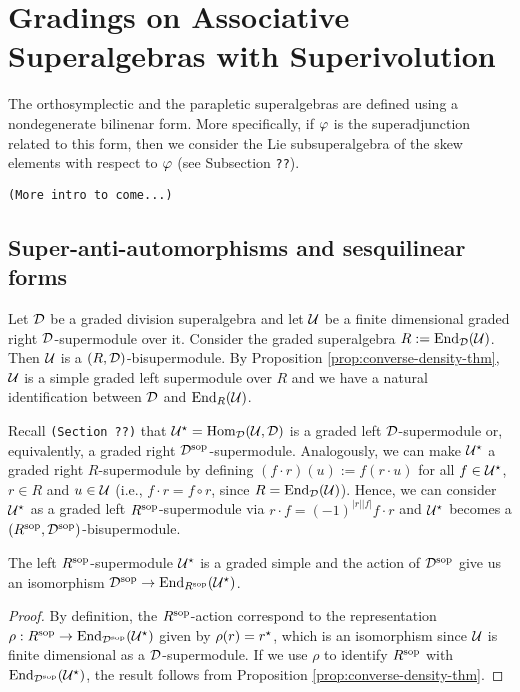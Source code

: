 \documentclass{amsbook}
\begin{document}
\chapter{Gradings on Associative Superalgebras with Superivolution}

The orthosymplectic and the parapletic superalgebras are defined using a nondegenerate bilinenar form. 
More specifically, if $\varphi$ is the superadjunction related to this form, then we consider the Lie subsuperalgebra of the skew elements with respect to $\varphi$ (see Subsection {\tt ??}). 

\vspace{5mm}
{\tt (More intro to come...)}



\section{Super-anti-automorphisms and sesquilinear forms}

Let $\mathcal{D}$ be a graded division superalgebra and let $\mathcal U$ be a finite dimensional graded right $\mathcal{D}$-supermodule over it. Consider the graded superalgebra $R := \operatorname{End}_{\mathcal{D}}(\mathcal U)$. Then $\mathcal U$ is a $(R, \mathcal{D})$-bisupermodule. By Proposition \ref{prop:converse-density-thm}, $\mathcal U$ is a simple graded left supermodule over $R$ and we have a natural identification between $\mathcal{D}$ and $\operatorname{End}_R(\mathcal U)$.

Recall {\tt (Section ??)} that $\mathcal U^\star = \operatorname{Hom}_{\mathcal{D}} (\mathcal U, \mathcal{D})$ is a graded left $\mathcal{D}$-supermodule or, equivalently, a graded right $\mathcal{D}^{\mathrm{sop}}$-supermodule. Analogously, we can make $\mathcal U^\star$ a graded right $R$-supermodule by defining $(f\cdot r) (u) := f(r\cdot u)$ for all $f\in \mathcal U^\star$, $r\in R$ and $u\in \mathcal U$ (i.e., $f\cdot r = f \circ r$, since $R = \operatorname{End}_{\mathcal{D}}(\mathcal U)$). Hence, we can consider $\mathcal U^\star$ as a graded left $R^{\mathrm{sop}}$-supermodule via $r\cdot f = (-1)^{|r||f|} f\cdot r$ %
and $\mathcal U^\star$ becomes a $(R^{\mathrm{sop}}, \mathcal{D}^{\mathrm{sop}})$-bisupermodule.

\begin{lemma}\label{lemma:U-star-R-sop}
    The left $R^{\mathrm{sop}}$-supermodule $\mathcal U^\star$ is a graded simple and the action of $\mathcal{D}^{\mathrm{sop}}$ give us an isomorphism $\mathcal{D}^{\mathrm{sop}} \to \operatorname{End}_{R^{\mathrm{sop}}}(\mathcal U^\star)$.
\end{lemma}

\begin{proof}
    By definition, the $R^{\mathrm{sop}}$-action correspond to the representation $\rho: R^{\mathrm{sop}} \to \operatorname{End}_{\mathcal{D}^{\mathrm{sop}}} (\mathcal U^\star)$ given by $ \rho(r) = r^\star$, which is an isomorphism since $\mathcal U$ is finite dimensional as a $\mathcal{D}$-supermodule. If we use $\rho$ to identify $R^{\mathrm{sop}}$ with $\operatorname{End}_{\mathcal{D}^{\mathrm{sop}}} (\mathcal U^\star)$, the result follows from Proposition \ref{prop:converse-density-thm}.
\end{proof}
\end{document}
